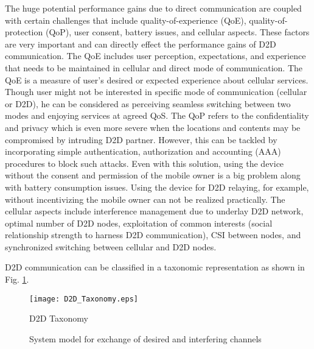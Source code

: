 \documentclass[article,10pt,twocolumn]{IEEEtran}
\begin{document}
The huge potential performance gains due to direct communication are coupled with certain challenges that include quality-of-experience (QoE), quality-of-protection (QoP), user consent, battery issues, and cellular aspects. These factors are very important and can directly effect the performance gains of D2D communication. The QoE includes user perception, expectations, and experience that needs to be maintained in cellular and direct mode of communication. The QoE is a measure of user's desired or expected experience about cellular services. Though user might not be interested in specific mode of communication (cellular or D2D), he can be considered as perceiving seamless switching between two modes and enjoying services at agreed QoS. The QoP refers to the confidentiality and privacy which is even more severe when the locations and contents may be compromised by intruding D2D partner. However, this can be tackled by incorporating simple authentication, authorization and accounting (AAA) procedures to block such attacks. Even with this solution, using the device without the consent and permission of the mobile owner is a big problem along with battery consumption issues. Using the device for D2D relaying, for example, without incentivizing the mobile owner can not be realized practically. The cellular aspects include interference management due to underlay D2D network, optimal number of D2D nodes, exploitation of common interests (social relationship strength to harness D2D communication), CSI between nodes, and synchronized switching between cellular and D2D nodes.
 
D2D communication can be classified in a taxonomic representation as shown in Fig. \ref{Figure:d2d_class}.

\begin{figure}[!htb]
\centering
\texttt{[image: D2D\_Taxonomy.eps]}
\caption{D2D Taxonomy}\label{Figure:d2d_class}
\vspace{-5mm}
\end{figure}

\begin{figure*}[!htb]
    \centering
    \caption{System model for exchange of desired and interfering channels}
    \label{Figure:sm}
\vspace{-3mm}
\end{figure*}
\end{document}
